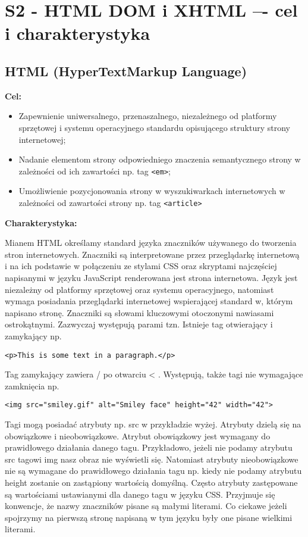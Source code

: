 \section{S2 - HTML DOM i XHTML –- cel i charakterystyka}

\subsection{HTML (HyperTextMarkup Language)}

\textbf{Cel:}
\begin{itemize}
\item Zapewnienie uniwersalnego, przenaszalnego, niezależnego od platformy sprzętowej i systemu operacyjnego standardu opisującego struktury strony internetowej;
\item Nadanie elementom strony odpowiedniego znaczenia semantycznego strony w zależności od ich zawartości np. tag \texttt{<em>};
\item Umożliwienie pozycjonowania strony w wyszukiwarkach internetowych w zależności od zawartości strony np. tag \texttt{<article>}
\end{itemize}

\textbf{Charakterystyka:}

Mianem HTML określamy standard języka znaczników używanego do tworzenia stron internetowych. Znaczniki są interpretowane przez przeglądarkę internetową i na ich podstawie w połączeniu ze stylami CSS oraz skryptami najczęściej napisanymi w języku JavaScript renderowana jest strona internetowa. Język jest niezależny od platformy sprzętowej oraz systemu operacyjnego, natomiast wymaga posiadania przeglądarki internetowej wspierającej standard w, którym napisano stronę. Znaczniki są słowami kluczowymi otoczonymi nawiasami ostrokątnymi. Zazwyczaj występują parami tzn. Istnieje tag otwierający i zamykający np.

\texttt{<p>This is some text in a paragraph.</p>}

Tag zamykający zawiera / po otwarciu < . Występują, także tagi nie wymagające zamknięcia np. 

\texttt{<img src="smiley.gif" alt="Smiley face" height="42" width="42">}

Tagi mogą posiadać atrybuty np. src w przykładzie wyżej. Atrybuty dzielą się na obowiązkowe i nieobowiązkowe. Atrybut obowiązkowy jest wymagany do prawidłowego działania danego tagu. Przykładowo, jeżeli nie podamy atrybutu src tagowi img nasz obraz nie wyświetli się. Natomiast atrybuty nieobowiązkowe nie są wymagane do prawidłowego działania tagu np. kiedy nie podamy atrybutu height zostanie on zastąpiony wartością domyślną. Często atrybuty zastępowane są wartościami ustawianymi dla danego tagu w języku CSS. Przyjmuje się konwencje, że nazwy znaczników pisane są małymi literami. Co ciekawe jeżeli spojrzymy na pierwszą stronę napisaną w tym języku były one pisane wielkimi literami.

